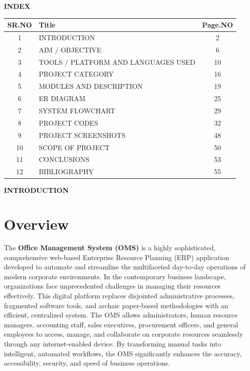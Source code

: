 ﻿\documentclass[12pt,a4paper]{report}
\begin{document}
\newpage
\begin{singlespace}
\vspace*{0.5cm}
\begin{center}
{\LARGE \textbf{INDEX}}
\end{center}
\vspace{1cm}
\begin{center}
\renewcommand{\arraystretch}{2.2}
\begin{tabular}{|c|p{10cm}|c|}
\hline
\textbf{SR.NO} & \textbf{Title} & \textbf{Page.NO} \\ \hline
1 & INTRODUCTION & 2 \\ \hline
2 & AIM / OBJECTIVE & 6 \\ \hline
3 & TOOLS / PLATFORM AND LANGUAGES USED & 10 \\ \hline
4 & PROJECT CATEGORY & 16 \\ \hline
5 & MODULES AND DESCRIPTION & 19 \\ \hline
6 & ER DIAGRAM & 25 \\ \hline
7 & SYSTEM FLOWCHART & 29 \\ \hline
8 & PROJECT CODES & 32 \\ \hline
9 & PROJECT SCREENSHOTS & 48 \\ \hline
10 & SCOPE OF PROJECT & 50 \\ \hline
11 & CONCLUSIONS & 53 \\ \hline
12 & BIBLIOGRAPHY & 55 \\ \hline
\end{tabular}
\renewcommand{\arraystretch}{1.0}
\end{center}
\end{singlespace}

\newpage
\vspace*{\fill}
\begin{center}
{\LARGE \textbf{INTRODUCTION}}
\end{center}
\vspace*{\fill}

\newpage
\section*{Overview}
The \textbf{Office Management System (OMS)} is a highly sophisticated, comprehensive web-based Enterprise Resource Planning (ERP) application developed to automate and streamline the multifaceted day-to-day operations of modern corporate environments. In the contemporary business landscape, organizations face unprecedented challenges in managing their resources effectively. This digital platform replaces disjointed administrative processes, fragmented software tools, and archaic paper-based methodologies with an efficient, centralized system. The OMS allows administrators, human resource managers, accounting staff, sales executives, procurement officers, and general employees to access, manage, and collaborate on corporate resources seamlessly through any internet-enabled device. By transforming manual tasks into intelligent, automated workflows, the OMS significantly enhances the accuracy, accessibility, security, and speed of business operations.
\end{document}
